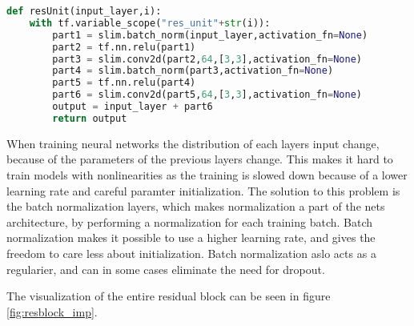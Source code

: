 \begin{lstlisting}[language=Python, label=lst:resblock, caption=resUnit function that creates the residual block]
def resUnit(input_layer,i):
    with tf.variable_scope("res_unit"+str(i)):
        part1 = slim.batch_norm(input_layer,activation_fn=None)
        part2 = tf.nn.relu(part1)
        part3 = slim.conv2d(part2,64,[3,3],activation_fn=None)
        part4 = slim.batch_norm(part3,activation_fn=None)
        part5 = tf.nn.relu(part4)
        part6 = slim.conv2d(part5,64,[3,3],activation_fn=None)
        output = input_layer + part6
        return output
\end{lstlisting}

When training neural networks the distribution of each layers input change, because of the parameters of the previous layers change\citep{BATCH}. This makes it hard to train models with nonlinearities as the training is slowed down because of a lower learning rate and careful paramter initialization. The solution to this problem is the batch normalization layers, which makes normalization a part of the nets architecture, by performing a normalization for each training batch. Batch normalization makes it possible to use a higher learning rate, and gives the freedom to care less about initialization. Batch normalization aslo acts as a regularier, and can in some cases eliminate the need for dropout. 

The visualization of the entire residual block can be seen in figure \ref{fig:resblock_imp}.


